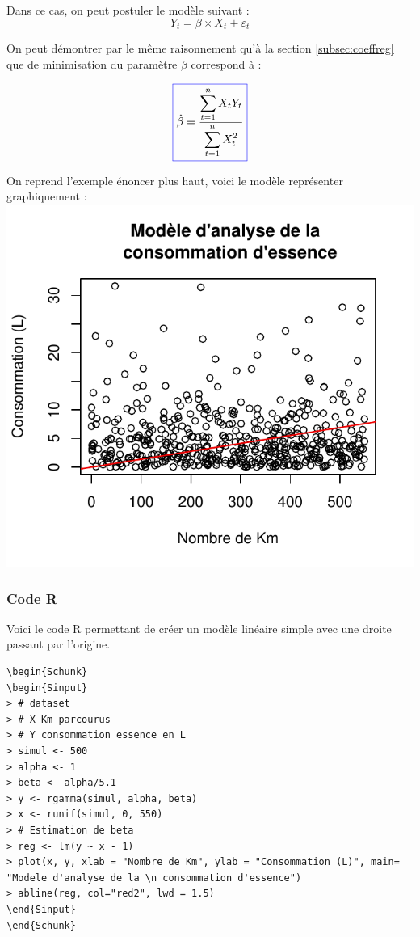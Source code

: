 \documentclass[11pt,french]{report}
\begin{document}
Dans ce cas, on peut postuler le modèle suivant :
\begin{equation}
\label{eq:regzero}
Y_t = \beta \times X_t + \varepsilon_t
\end{equation}

On peut démontrer par le même raisonnement qu'à la section \ref{subsec:coeffreg} que de minimisation du paramètre $\beta$ correspond à :

\begin{equation}
\label{eq:betasimp}
\color{blue}
\boxed{\color{black}
\hat{\beta} = \frac{\displaystyle\sum_{t=1}^n X_t Y_t}{\displaystyle\sum_{t=1}^n X_t^2}}
\end{equation}

On reprend l'exemple énoncer plus haut, voici le modèle représenter graphiquement :
\includegraphics{notes_de_cours-009}

\subsubsection*{Code R}
Voici le code R permettant de créer un modèle linéaire simple avec une droite passant par l'origine.

\begin{lstlisting}[linerange=\\begin\{Sinput\}-\\end\{Sinput\},includerangemarker=false, caption = Code source en R pour l'exemple]
\begin{Schunk}
\begin{Sinput}
> # dataset
> # X Km parcourus
> # Y consommation essence en L
> simul <- 500
> alpha <- 1
> beta <- alpha/5.1
> y <- rgamma(simul, alpha, beta)
> x <- runif(simul, 0, 550)
> # Estimation de beta
> reg <- lm(y ~ x - 1)
> plot(x, y, xlab = "Nombre de Km", ylab = "Consommation (L)", main= "Modele d'analyse de la \n consommation d'essence")
> abline(reg, col="red2", lwd = 1.5)
\end{Sinput}
\end{Schunk}
\end{lstlisting}
\bigskip
\end{document}
